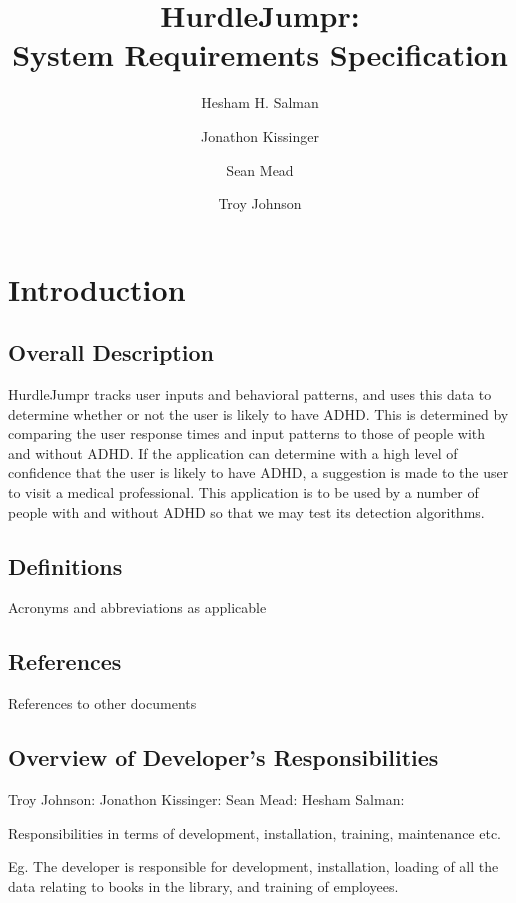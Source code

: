 \documentclass[a4wide]{article}
\title{HurdleJumpr:\\ System Requirements Specification}
\author{Hesham H. Salman \and Jonathon Kissinger \and Sean Mead \and Troy Johnson}
\begin{document}
\maketitle

\section{Introduction}

\subsection{Overall Description}

HurdleJumpr tracks user inputs and behavioral patterns, and uses this data to
determine whether or not the user is likely to have ADHD. This is determined by
comparing the user response times and input patterns to those of people with and
without ADHD. If the application can determine with a high level of confidence
that the user is likely to have ADHD, a suggestion is made to the user to visit
a medical professional. \newline \newline
This application is to be used by a number of people with and without ADHD so
that we may test its detection algorithms.

\subsection{Definitions}

Acronyms and abbreviations as applicable

\subsection{References}

References to other documents

\subsection{Overview of Developer's Responsibilities}


Troy Johnson:
Jonathon Kissinger:
Sean Mead:
Hesham Salman:

Responsibilities in terms of development, installation, training, maintenance
etc.

Eg. The developer is responsible for development, installation,
loading of all the data relating to books in the library,
and training of employees.
\end{document}
